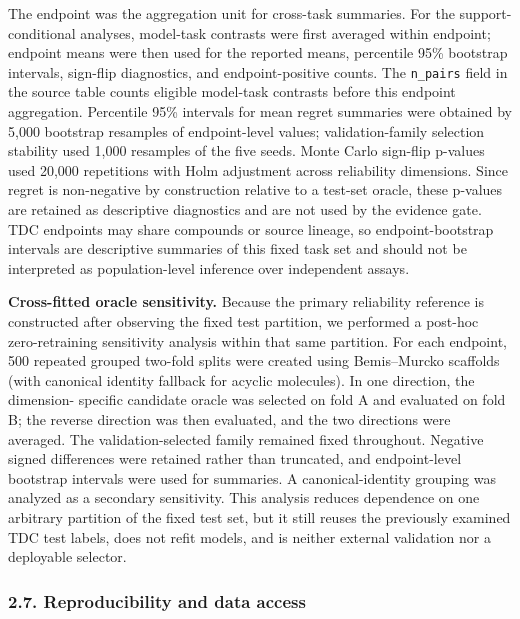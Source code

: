 \documentclass[
]{article}
\begin{document}
The endpoint was the aggregation unit for cross-task summaries. For the
support-conditional analyses, model-task contrasts were first averaged
within endpoint; endpoint means were then used for the reported means,
percentile 95\% bootstrap intervals, sign-flip diagnostics, and
endpoint-positive counts. The \texttt{n\_pairs} field in the source
table counts eligible model-task contrasts before this endpoint
aggregation. Percentile 95\% intervals for mean regret summaries were
obtained by 5,000 bootstrap resamples of endpoint-level values;
validation-family selection stability used 1,000 resamples of the five
seeds. Monte Carlo sign-flip p-values used 20,000 repetitions with Holm
adjustment across reliability dimensions. Since regret is non-negative
by construction relative to a test-set oracle, these p-values are
retained as descriptive diagnostics and are not used by the evidence
gate. TDC endpoints may share compounds or source lineage, so
endpoint-bootstrap intervals are descriptive summaries of this fixed
task set and should not be interpreted as population-level inference
over independent assays.

\textbf{Cross-fitted oracle sensitivity.}
Because the primary reliability reference is constructed after observing the
fixed test partition, we performed a post-hoc zero-retraining sensitivity
analysis within that same partition. For each endpoint, 500 repeated grouped
two-fold splits were created using Bemis--Murcko scaffolds (with canonical
identity fallback for acyclic molecules). In one direction, the dimension-
specific candidate oracle was selected on fold A and evaluated on fold B; the
reverse direction was then evaluated, and the two directions were averaged.
The validation-selected family remained fixed throughout. Negative signed
differences were retained rather than truncated, and endpoint-level bootstrap
intervals were used for summaries. A canonical-identity grouping was analyzed
as a secondary sensitivity. This analysis reduces dependence on one arbitrary
partition of the fixed test set, but it still reuses the previously examined
TDC test labels, does not refit models, and is neither external validation nor
a deployable selector.

\subsubsection{2.7. Reproducibility and data
access}\label{reproducibility-and-data-access}
\end{document}
